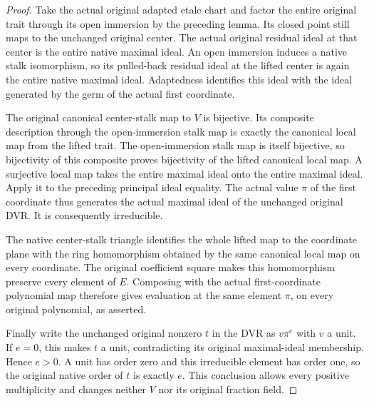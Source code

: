 \begin{proof}
Take the actual original adapted etale chart and factor the entire original trait through its open immersion by the preceding lemma. Its closed point still maps to the unchanged original center. The actual original residual ideal at that center is the entire native maximal ideal. An open immersion induces a native stalk isomorphism, so its pulled-back residual ideal at the lifted center is again the entire native maximal ideal. Adaptedness identifies this ideal with the ideal generated by the germ of the actual first coordinate.

The original canonical center-stalk map to $V$ is bijective. Its composite description through the open-immersion stalk map is exactly the canonical local map from the lifted trait. The open-immersion stalk map is itself bijective, so bijectivity of this composite proves bijectivity of the lifted canonical local map. A surjective local map takes the entire maximal ideal onto the entire maximal ideal. Apply it to the preceding principal ideal equality. The actual value $\pi$ of the first coordinate thus generates the actual maximal ideal of the unchanged original DVR. It is consequently irreducible.

The native center-stalk triangle identifies the whole lifted map to the coordinate plane with the ring homomorphism obtained by the same canonical local map on every coordinate. The original coefficient square makes this homomorphism preserve every element of $E$. Composing with the actual first-coordinate polynomial map therefore gives evaluation at the same element $\pi$, on every original polynomial, as asserted.

Finally write the unchanged original nonzero $t$ in the DVR as $v\pi^e$ with $v$ a unit. If $e=0$, this makes $t$ a unit, contradicting its original maximal-ideal membership. Hence $e>0$. A unit has order zero and this irreducible element has order one, so the original native order of $t$ is exactly $e$. This conclusion allows every positive multiplicity and changes neither $V$ nor its original fraction field.
\end{proof}
